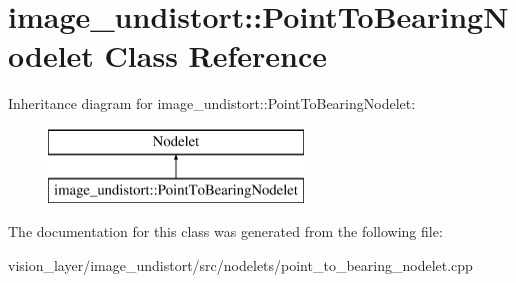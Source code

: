 \hypertarget{classimage__undistort_1_1PointToBearingNodelet}{}\section{image\+\_\+undistort\+:\+:Point\+To\+Bearing\+Nodelet Class Reference}
\label{classimage__undistort_1_1PointToBearingNodelet}
Inheritance diagram for image\+\_\+undistort\+:\+:Point\+To\+Bearing\+Nodelet\+:\begin{figure}[H]
\begin{center}
\leavevmode
\includegraphics[height=2.000000cm]{classimage__undistort_1_1PointToBearingNodelet}
\end{center}
\end{figure}


The documentation for this class was generated from the following file\+:\begin{DoxyCompactItemize}
\item 
vision\+\_\+layer/image\+\_\+undistort/src/nodelets/point\+\_\+to\+\_\+bearing\+\_\+nodelet.\+cpp\end{DoxyCompactItemize}
